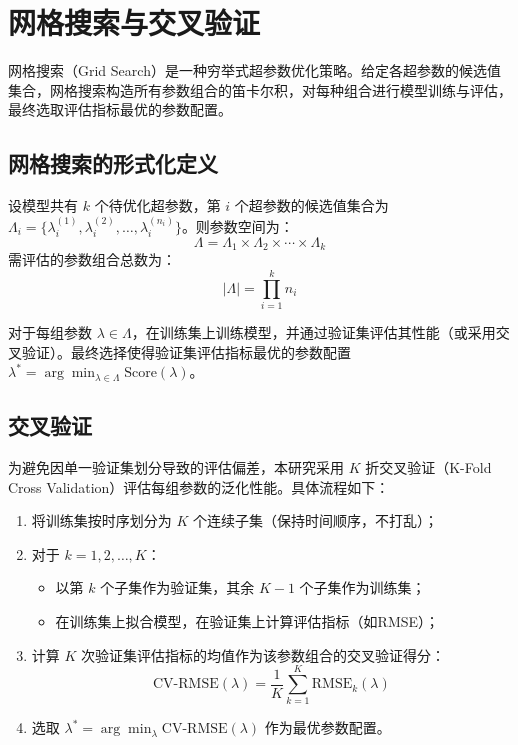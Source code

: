 \documentclass[12pt,a4paper,oneside]{ctexbook}
\begin{document}
	\section{网格搜索与交叉验证}
	
	网格搜索（Grid Search）是一种穷举式超参数优化策略。给定各超参数的候选值集合，网格搜索构造所有参数组合的笛卡尔积，对每种组合进行模型训练与评估，最终选取评估指标最优的参数配置。
	
	\subsection{网格搜索的形式化定义}
	
	设模型共有 $k$ 个待优化超参数，第 $i$ 个超参数的候选值集合为 $\Lambda_i = \{\lambda_i^{(1)}, \lambda_i^{(2)}, \ldots, \lambda_i^{(n_i)}\}$。则参数空间为：
	\[
	\Lambda = \Lambda_1 \times \Lambda_2 \times \cdots \times \Lambda_k
	\]
	需评估的参数组合总数为：
	\[
	|\Lambda| = \prod_{i=1}^k n_i
	\]
	
	对于每组参数 $\lambda \in \Lambda$，在训练集上训练模型，并通过验证集评估其性能（或采用交叉验证）。最终选择使得验证集评估指标最优的参数配置 $\lambda^* = \arg\min_{\lambda \in \Lambda} \text{Score}(\lambda)$。
	
	\subsection{交叉验证}
	
	为避免因单一验证集划分导致的评估偏差，本研究采用 $K$ 折交叉验证（K-Fold Cross Validation）评估每组参数的泛化性能。具体流程如下：
	
	\begin{enumerate}
		\item 将训练集按时序划分为 $K$ 个连续子集（保持时间顺序，不打乱）；
		\item 对于 $k = 1, 2, \ldots, K$：
		\begin{itemize}
			\item 以第 $k$ 个子集作为验证集，其余 $K-1$ 个子集作为训练集；
			\item 在训练集上拟合模型，在验证集上计算评估指标（如RMSE）；
		\end{itemize}
		\item 计算 $K$ 次验证集评估指标的均值作为该参数组合的交叉验证得分：
		\[
		\text{CV-RMSE}(\lambda) = \frac{1}{K} \sum_{k=1}^K \text{RMSE}_k(\lambda)
		\]
		\item 选取 $\lambda^* = \arg\min_{\lambda} \text{CV-RMSE}(\lambda)$ 作为最优参数配置。
	\end{enumerate}
	
\end{document}
